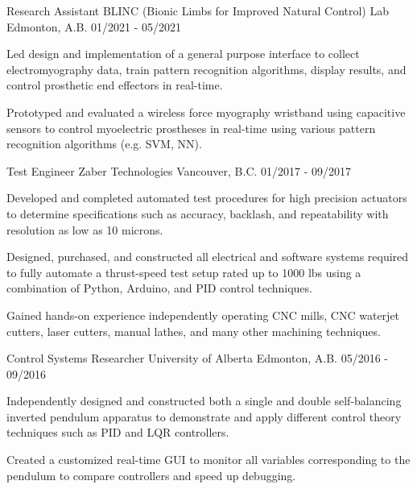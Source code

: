 

\begin{cventries}

  \cventry
    {Research Assistant} %
    {BLINC (Bionic Limbs for Improved Natural Control) Lab} %
    {Edmonton, A.B.} %
    {01/2021 - 05/2021} %
    {
      \begin{cvitems}
        \item {Led design and implementation of a general purpose interface to collect electromyography data, train pattern recognition algorithms, display results, and control prosthetic end effectors in real-time.}
        \item {Prototyped and evaluated a wireless force myography wristband using capacitive sensors to control myoelectric
        prostheses in real-time using various pattern recognition algorithms (e.g. SVM, NN).}
      \end{cvitems}
    }

  \cventry
    {Test Engineer} %
    {Zaber Technologies} %
    {Vancouver, B.C.} %
    {01/2017 - 09/2017} %
    {
      \begin{cvitems}
        \item {Developed and completed automated test procedures for high precision actuators to determine specifications such as accuracy, backlash, and repeatability with resolution as low as 10 microns.}
        \item {Designed, purchased, and constructed all electrical and software systems required to fully automate a thrust-speed test setup rated up to 1000 lbs using a combination of Python, Arduino, and PID control techniques.}
        \item {Gained hands-on experience independently operating CNC mills, CNC waterjet cutters, laser cutters, manual lathes, and many other machining techniques.}
      \end{cvitems}
    }

  \cventry
    {Control Systems Researcher} %
    {University of Alberta} %
    {Edmonton, A.B.} %
    {05/2016 - 09/2016} %
    {
      \begin{cvitems}
        \item {Independently designed and constructed both a single and double self-balancing inverted pendulum apparatus to demonstrate and apply different control theory techniques such as PID and LQR controllers.}
        \item {Created a customized real-time GUI to monitor all variables corresponding to the pendulum to compare controllers and speed up debugging.}
      \end{cvitems}
    }

\end{cventries}
